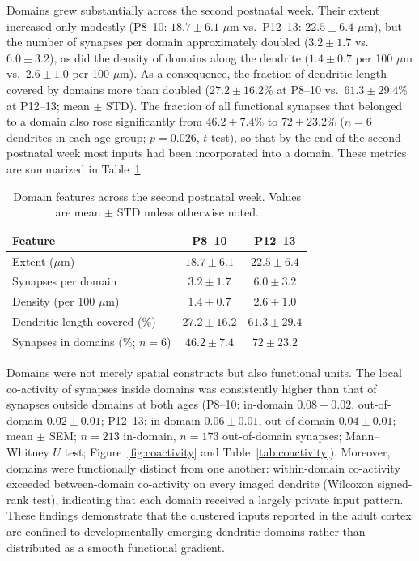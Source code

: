 \documentclass[11pt]{article}
\begin{document}
Domains grew substantially across the second postnatal week. Their extent increased only modestly (P8--10: $18.7 \pm 6.1$ $\mu$m vs.\ P12--13: $22.5 \pm 6.4$ $\mu$m), but the number of synapses per domain approximately doubled ($3.2 \pm 1.7$ vs.\ $6.0 \pm 3.2$), as did the density of domains along the dendrite ($1.4 \pm 0.7$ per 100 $\mu$m vs.\ $2.6 \pm 1.0$ per 100 $\mu$m). As a consequence, the fraction of dendritic length covered by domains more than doubled ($27.2 \pm 16.2\%$ at P8--10 vs.\ $61.3 \pm 29.4\%$ at P12--13; mean $\pm$ STD). The fraction of all functional synapses that belonged to a domain also rose significantly from $46.2 \pm 7.4\%$ to $72 \pm 23.2\%$ ($n = 6$ dendrites in each age group; $p = 0.026$, $t$-test), so that by the end of the second postnatal week most inputs had been incorporated into a domain. These metrics are summarized in Table~\ref{tab:domains}.

\begin{table}[htbp]
\centering
\caption{Domain features across the second postnatal week. Values are mean $\pm$ STD unless otherwise noted.}
\label{tab:domains}
\begin{tabular}{lcc}
\toprule
Feature & P8--10 & P12--13 \\
\midrule
Extent ($\mu$m) & $18.7 \pm 6.1$ & $22.5 \pm 6.4$ \\
Synapses per domain & $3.2 \pm 1.7$ & $6.0 \pm 3.2$ \\
Density (per 100 $\mu$m) & $1.4 \pm 0.7$ & $2.6 \pm 1.0$ \\
Dendritic length covered (\%) & $27.2 \pm 16.2$ & $61.3 \pm 29.4$ \\
Synapses in domains (\%; $n = 6$) & $46.2 \pm 7.4$ & $72 \pm 23.2$ \\
\bottomrule
\end{tabular}
\end{table}

Domains were not merely spatial constructs but also functional units. The local co-activity of synapses inside domains was consistently higher than that of synapses outside domains at both ages (P8--10: in-domain $0.08 \pm 0.02$, out-of-domain $0.02 \pm 0.01$; P12--13: in-domain $0.06 \pm 0.01$, out-of-domain $0.04 \pm 0.01$; mean $\pm$ SEM; $n = 213$ in-domain, $n = 173$ out-of-domain synapses; Mann--Whitney $U$ test; Figure~\ref{fig:coactivity} and Table~\ref{tab:coactivity}). Moreover, domains were functionally distinct from one another: within-domain co-activity exceeded between-domain co-activity on every imaged dendrite (Wilcoxon signed-rank test), indicating that each domain received a largely private input pattern. These findings demonstrate that the clustered inputs reported in the adult cortex \citep{iacaruso2017synaptic,wilson2016orientation,takahashi2012locally} are confined to developmentally emerging dendritic domains rather than distributed as a smooth functional gradient.
\end{document}
